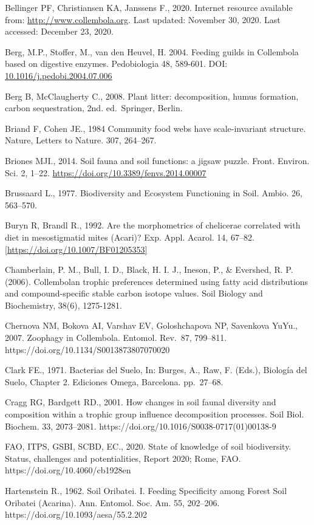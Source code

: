 \documentclass[10pt,oneside]{article}
\begin{document}
Bellinger PF, Christiansen KA, Janssens F., 2020. Internet resource
available from: \url{http://www.collembola.org}. Last updated: November
30, 2020. Last accessed: December 23, 2020.

Berg, M.P., Stoffer, M., van den Heuvel, H. 2004. Feeding guilds in
Collembola based on digestive enzymes. Pedobiologia 48, 589-601. DOI:
\href{http://dx.doi.org/10.1016\%2Fj.pedobi.2004.07.006}{10.1016/j.pedobi.2004.07.006}

Berg B, McClaugherty C., 2008. Plant litter: decomposition, humus
formation, carbon sequestration, 2nd. ed.~Springer, Berlin.

Briand F, Cohen JE., 1984 Community food webs have scale-invariant
structure. Nature, Letters to Nature. 307, 264--267.

Briones MJI., 2014. Soil fauna and soil functions: a jigsaw puzzle.
Front. Environ. Sci. 2, 1--22.
\url{https://doi.org/10.3389/fenvs.2014.00007}

Brussaard L., 1977. Biodiversity and Ecosystem Functioning in Soil.
Ambio. 26, 563--570.

Buryn R, Brandl R., 1992. Are the morphometrics of chelicerae correlated
with diet in mesostigmatid mites (Acari)? Exp. Appl. Acarol. 14, 67--82.
\href{https://doi.org/10.1007/BF01205353}{{[}https://doi.org/10.1007/BF01205353{]}}

Chamberlain, P. M., Bull, I. D., Black, H. I. J., Ineson, P., \&
Evershed, R. P. (2006). Collembolan trophic preferences determined using
fatty acid distributions and compound-specific stable carbon isotope
values. Soil Biology and Biochemistry, 38(6), 1275-1281.

Chernova NM, Bokova AI, Varshav EV, Goloshchapova NP, Savenkova YuYu.,
2007. Zoophagy in Collembola. Entomol. Rev.~87, 799--811.
https://doi.org/10.1134/S0013873807070020

Clark FE., 1971. Bacterias del Suelo, In: Burges, A., Raw, F. (Eds.),
Biología del Suelo, Chapter 2. Ediciones Omega, Barcelona. pp.~27--68.

Cragg RG, Bardgett RD., 2001. How changes in soil faunal diversity and
composition within a trophic group influence decomposition processes.
Soil Biol. Biochem. 33, 2073--2081.
https://doi.org/10.1016/S0038-0717(01)00138-9

FAO, ITPS, GSBI, SCBD, EC., 2020. State of knowledge of soil
biodiversity. Status, challenges and potentialities, Report 2020; Rome,
FAO. https://doi.org/10.4060/cb1928en

Hartenstein R., 1962. Soil Oribatei. I. Feeding Specificity among Forest
Soil Oribatei (Acarina). Ann. Entomol. Soc. Am. 55, 202--206.
https://doi.org/10.1093/aesa/55.2.202
\end{document}
